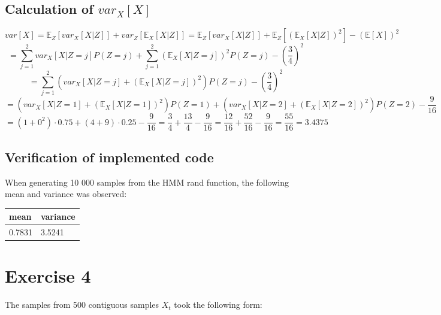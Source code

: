 \documentclass[]{article}
\begin{document}
\hypertarget{calculation-of-var_x-x}{%
\subsection{\texorpdfstring{Calculation of
\(var_X [X]\)}{Calculation of var\_X {[}X{]}}}\label{calculation-of-var_x-x}}

\[var[X] = \mathbb{E}_Z[var_X[X | Z]] + var_Z [\mathbb{E}_X[X | Z]] = \mathbb{E}_Z[var_X[X | Z]] + \mathbb{E}_Z [(\mathbb{E}_X [X | Z])^2] - (\mathbb{E}[X])^2\]
\[= \sum_{j = 1}^{2} var_X [X | Z = j] P(Z = j) + \sum_{j = 1}^{2} (\mathbb{E}_X[X | Z = j])^2 P(Z = j) - (\frac{3}{4})^2\]
\[= \sum_{j = 1}^{2} (var_X [X | Z = j] + (\mathbb{E}_X[X | Z = j])^2) P(Z = j) - (\frac{3}{4})^2\]
\[= (var_X [X | Z = 1] + (\mathbb{E}_X[X | Z = 1])^2) P(Z = 1) + (var_X [X | Z = 2] + (\mathbb{E}_X[X | Z = 2])^2) P(Z = 2) - \frac{9}{16}\]
\[= (1 + 0^2) \cdot 0.75 + (4 + 9) \cdot 0.25 - \frac{9}{16} = \frac{3}{4} + \frac{13}{4} - \frac{9}{16} = \frac{12}{16} + \frac{52}{16} - \frac{9}{16} = \frac{55}{16} = 3.4375\]

\hypertarget{verification-of-implemented-code}{%
\subsection{Verification of implemented
code}\label{verification-of-implemented-code}}

When generating 10 000 samples from the HMM rand function, the following
mean and variance was observed:

\begin{longtable}[]{@{}ll@{}}
\toprule
mean & variance\tabularnewline
\midrule
\endhead
0.7831 & 3.5241\tabularnewline
\bottomrule
\end{longtable}

\newpage

\hypertarget{exercise-4}{%
\section{Exercise 4}\label{exercise-4}}

The samples from 500 contiguous samples \(X_t\) took the following form:
\end{document}
